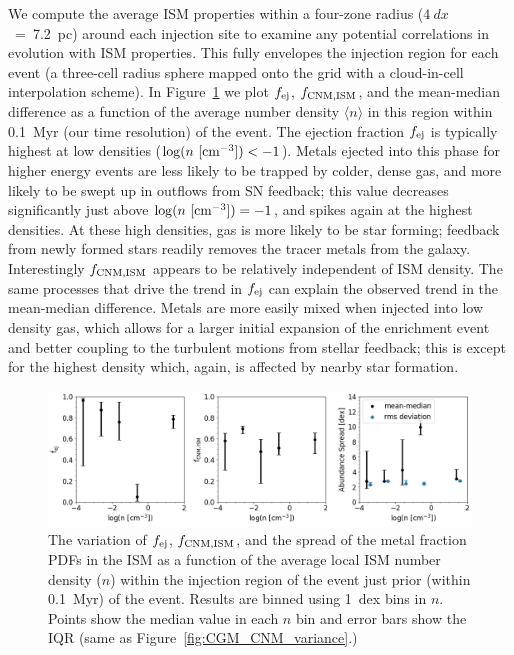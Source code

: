 \documentclass[twocolumn]{aastex62}
\begin{document}
We compute the average ISM properties within a four-zone radius ($4~dx $~=~7.2~pc) around each injection site to examine any potential correlations in evolution with ISM properties. This fully envelopes the injection region for each event (a three-cell radius sphere mapped onto the grid with a cloud-in-cell interpolation scheme). In Figure~\ref{fig:ISM_variance} we plot $f_{\rm ej}$, $f_{\rm CNM, ISM}$, and the mean-median difference as a function of the average number density $\langle n \rangle$ in this region within 0.1~Myr (our time resolution) of the event. The ejection fraction $f_{\rm ej}$ is typically highest at low densities ($\log(n ~[\rm{cm}^{-3}]) < -1$). Metals ejected into this phase for higher energy events are less likely to be trapped by colder, dense gas, and more likely to be swept up in outflows from SN feedback; this value decreases significantly just above $\log(n ~[\rm{cm}^{-3}]) = -1$, and spikes again at the highest densities. At these high densities, gas is more likely to be star forming; feedback from newly formed stars readily removes the tracer metals from the galaxy. Interestingly $f_{\rm CNM,ISM}$ appears to be relatively independent of ISM density. The same processes that drive the trend in $f_{\rm ej}$ can explain the observed trend in the mean-median difference. Metals are more easily mixed when injected into low density gas, which allows for a larger initial expansion of the enrichment event and better coupling to the turbulent motions from stellar feedback; this is except for the highest density which, again, is affected by nearby star formation.

 \begin{figure}
   \centering
   \includegraphics[width=0.95\linewidth]{combined_rms_n_dependence}
   \caption{The variation of $f_{\rm ej}$, $f_{\rm CNM, ISM}$, and the spread of the metal fraction PDFs in the ISM as a function of the average local ISM number density ($n$) within the injection region of the event just prior (within 0.1~Myr) of the event. Results are binned using 1~dex bins in $n$. Points show the median value in each $n$ bin and error bars show the IQR (same as Figure~\ref{fig:CGM_CNM_variance}.)}
   \label{fig:ISM_variance}
 \end{figure}
 
\end{document}

